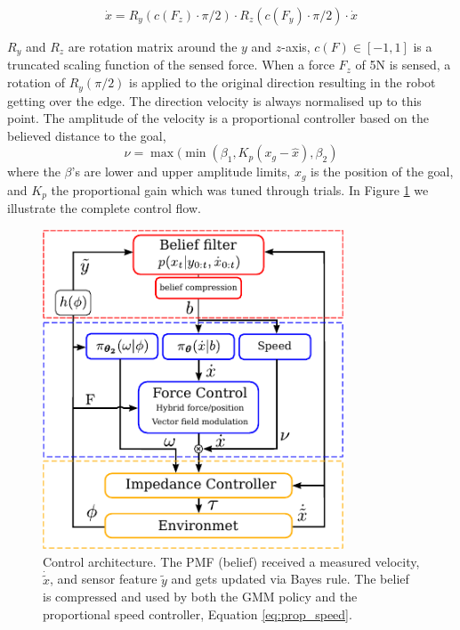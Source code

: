 \begin{equation}
  \dot{x} = R_y(c(F_z) \cdot \pi/2) \cdot R_z(c(F_y) \cdot \pi/2) \cdot \dot{x} \label{eq:modulation}
\end{equation}

$R_y$ and $R_z$ are rotation matrix around the $y$ and $z$-axis, $c(F) \in [-1,1]$ is a truncated scaling function of the sensed 
force.  When a force $F_z$ of 5N is sensed, a rotation of $R_y(\pi/2)$ is applied to the original direction resulting in the robot
getting over the edge. The direction velocity is always normalised up to this point. The amplitude of the velocity is a proportional
controller based on the believed distance to the goal,
\begin{equation}
  \nu = \max(\min(\beta_1,K_p (x_g - \hat{x}),\beta_2)\label{eq:prop_speed}
\end{equation}
where the $\beta$'s are lower and upper amplitude limits, $x_g$ is the position of the
goal, and $K_p$ the proportional gain which was tuned through trials. In Figure \ref{fig:control_flow}
we illustrate the complete control flow.

\begin{figure}
  \centering
  \includegraphics[width=0.8\textwidth]{./ch4-PiH/Figures/control_flow_final.pdf}
  \caption{Control architecture. The PMF (belief) received a measured velocity, $\dot{\tilde{x}}$, and sensor feature $\tilde{y}$ and gets updated 
  via Bayes rule. The belief is compressed and used by both the GMM policy and the proportional speed controller, Equation \ref{eq:prop_speed}.}
  \label{fig:control_flow}
\end{figure}

